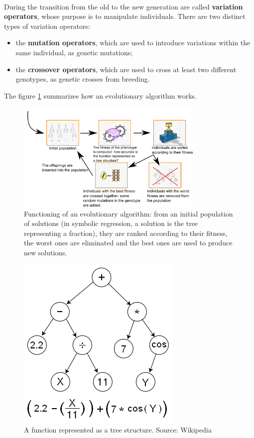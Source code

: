 ~~\\
During the transition from the old to the new generation are called \textbf{variation operators}, whose purpose is to manipulate individuals. There are two distinct types of variation operators:
\begin{itemize}
	\item the \textbf{mutation operators}, which are used to introduce variations within the same individual, as genetic mutations;
	\item the \textbf{crossover operators}, which are used to cross at least two different genotypes, as genetic crosses from breeding.
\end{itemize}

The figure \ref{fig:algorithmes_evolutionnistes_synopsis} summarizes how an evolutionary algorithm works.

\begin{figure}[htb]
	\centering
		\includegraphics[width=0.8\textwidth]{genetic_programming_regression_synopsis.png}
	\caption[Functioning of an evolutionary algorithm]{Functioning of an evolutionary algorithm: from an initial population of solutions (in symbolic regression, a solution is the tree representing a fraction), they are ranked according to their fitness, the worst ones are eliminated and the best ones are used to produce new solutions.}
	\label{fig:algorithmes_evolutionnistes_synopsis}
\end{figure}

\begin{figure}[htb]
	\centering	
		\includegraphics[scale=0.45]{Genetic_Program_Tree.png}
	\caption[A function represented as a tree structure.]{A function represented as a tree structure. Source: Wikipedia}
	\label{fig:Genetic_Program_Tree}
\end{figure}

